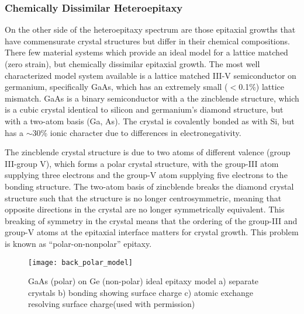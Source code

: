 \subsubsection{Chemically Dissimilar Heteroepitaxy}
On the other side of the heteroepitaxy spectrum are those epitaxial growths that have commensurate crystal structures but differ in their chemical compositions. There few material systems which provide an ideal model for a lattice matched (zero strain), but chemically dissimilar epitaxial growth. The most well characterized model system available is a lattice matched III-V semiconductor on germanium, specifically GaAs, which has an extremely small (\(<\)0.1\%) lattice mismatch. GaAs is a binary semiconductor with a the zincblende structure, which is a cubic crystal identical to silicon and germanium's diamond structure, but with a two-atom basis (Ga, As). The crystal is covalently bonded as with Si, but has a \(\sim\)30\% ionic character due to differences in electronegativity\cite{Christensen1987}.

The zincblende crystal structure is due to two atoms of different valence (group III-group V), which forms a polar crystal structure, with the group-III atom supplying three electrons and the group-V atom supplying five electrons to the bonding structure. The two-atom basis of zincblende breaks the diamond crystal structure such that the structure is no longer centrosymmetric, meaning that opposite directions in the crystal are no longer symmetrically equivalent. This breaking of symmetry in the crystal means that the ordering of the group-III and group-V atoms at the epitaxial interface matters for crystal growth. This problem is known as ``polar-on-nonpolar'' epitaxy\cite{Biegelsen1992,Kroemer1987}.
\begin{figure}
    \centering
    \texttt{[image: back\_polar\_model]}
    \caption[Atomic model of polar on non-polar epitaxy]{\label{fig:back_polar_model}GaAs (polar) on Ge (non-polar) ideal epitaxy model a) separate crystals b) bonding showing surface charge c) atomic exchange resolving surface charge\cite{Biegelsen1992}(used with permission)}
\end{figure}

